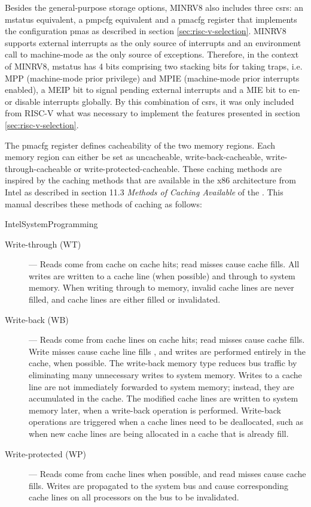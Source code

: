 Besides the general-purpose storage options, MINRV8 also includes three \glspl{csr}: an \gls{mstatus} equivalent, a \gls{pmpcfg} equivalent and a \gls{pmacfg} register that implements the configuration \glspl{pma} as described in section \ref{sec:risc-v-selection}.
MINRV8 supports external interrupts as the only source of interrupts and an environment call to machine-mode as the only source of exceptions.
Therefore, in the context of MINRV8, \gls{mstatus} has 4 bits comprising two stacking bits for taking traps, i.e. MPP (machine-mode prior privilege) and MPIE (machine-mode prior interrupts enabled), a MEIP bit to signal pending external interrupts and a MIE bit to en- or disable interrupts globally.
By this combination of \glspl{csr}, it was only included from RISC-V what was necessary to implement the features presented in section \ref{sec:risc-v-selection}.

The \gls{pmacfg} register defines cacheability of the two memory regions.
Each memory region can either be set as uncacheable, write-back-cacheable, write-through-cacheable or write-protected-cacheable.
These caching methods are inspired by the caching methods that are available in the x86 architecture from Intel as described in section 11.3 \textit{Methods of Caching Available} of the  \cite{IntelSystemProgramming}.
This manual describes these methods of caching as follows:
\begin{displaycquote}[p.11-7]{IntelSystemProgramming}
    \textelp{}
    \begin{description}
        \item[Write-through (WT)] --- \textelp{} Reads come from cache on cache hits; read misses cause cache fills. \textelp{}
        All writes are written to a cache line (when possible) and through to system memory.
        When writing through to memory, invalid cache lines are never filled, and cache lines are either filled or invalidated. \textelp{}
        \item[Write-back (WB)] --- \textelp{} Reads come from cache lines on cache hits; read misses cause cache fills. \textelp{}
        Write misses cause cache line fills \textelp{}, and writes are performed entirely in the cache, when possible. \textelp{}
        The write-back memory type reduces bus traffic by eliminating many unnecessary writes to system memory.
        Writes to a cache line are not immediately forwarded to system memory; instead, they are accumulated in the cache.
        The modified cache lines are written to system memory later, when a write-back operation is performed.
        Write-back operations are triggered when a cache lines need to be deallocated, such as when new cache lines are being allocated in a cache that is already fill. \textelp{}
        \item[Write-protected (WP)] --- Reads come from cache lines when possible, and read misses cause cache fills.
        Writes are propagated to the system bus and cause corresponding cache lines on all processors on the bus to be invalidated.
        \textelp{}
    \end{description}
\end{displaycquote}

